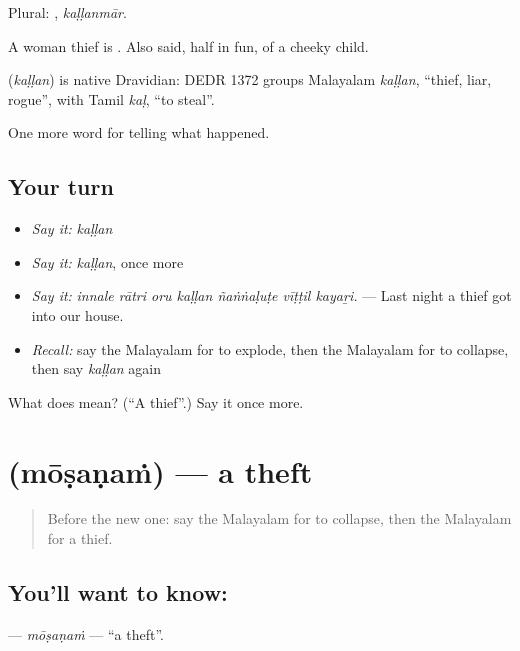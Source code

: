 Plural: , \emph{kaḷḷanmār}.

A woman thief is . Also said, half in fun, of a cheeky child.

\begin{cousinweb}
\textbf{} (\emph{kaḷḷan}) is native Dravidian: DEDR 1372 groups Malayalam \emph{kaḷḷan}, \textquotedblleft{}thief, liar, rogue\textquotedblright{}, with Tamil \emph{kaḷ}, \textquotedblleft{}to steal\textquotedblright{}.
\end{cousinweb}

\begin{grammarlens}[title={What you've built}]
One more word for telling what happened.
\end{grammarlens}

\subsection*{Your turn}
\begin{itemize}
\raggedright
  \item \emph{Say it:} \emph{kaḷḷan}
  \item \emph{Say it:} \emph{kaḷḷan}, once more
  \item \emph{Say it:} \emph{innale rātri oru kaḷḷan ñaṅṅaḷuṭe vīṭṭil kayaṟi.} — Last night a thief got into our house.
  \item \emph{Recall:} say the Malayalam for to explode, then the Malayalam for to collapse, then say \emph{kaḷḷan} again
\end{itemize}

\begin{tcolorbox}[breakable,colback=teal!4,colframe=teal!35!black,title={Before you move on}]
What does  mean? (\textquotedblleft{}A thief\textquotedblright{}.) Say it once more.
\end{tcolorbox}
\section[\texorpdfstring{\ml{മോഷണം} (mōṣaṇaṁ)}{മോഷണം (mōṣaṇaṁ)}]{ (mōṣaṇaṁ) — a theft}

\label{lesson:ML-C364-mosanam}



\begin{quote}
Before the new one: say the Malayalam for to collapse, then the Malayalam for a thief.
\end{quote}

\subsection*{You'll want to know: }
\textbf{} — \emph{mōṣaṇaṁ} — \textquotedblleft{}a theft\textquotedblright{}.


